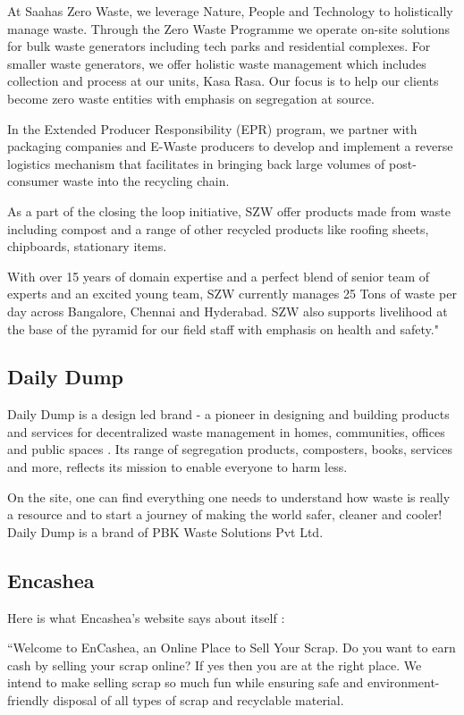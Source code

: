 \documentclass[10pt]{article}
\begin{document}
At Saahas Zero Waste, we leverage Nature, People and Technology to holistically manage waste. Through the Zero Waste Programme we operate on-site solutions for bulk waste generators including tech parks and residential complexes. For smaller waste generators, we offer holistic waste management which includes collection and process at our units, Kasa Rasa. Our focus is to help our clients become zero waste entities with emphasis on segregation at source.

In the Extended Producer Responsibility (EPR) program, we partner with packaging companies and E-Waste producers to develop and implement a reverse logistics mechanism that facilitates in bringing back large volumes of post-consumer waste into the recycling chain.

As a part of the closing the loop initiative, SZW offer products made from waste including compost and a range of other recycled products like roofing sheets, chipboards, stationary items.

With over 15 years of domain expertise and a perfect blend of senior team of experts and an excited young team, SZW currently manages 25 Tons of waste per day across Bangalore, Chennai and Hyderabad. SZW also supports livelihood at the base of the pyramid for our field staff with emphasis on health and safety."

\subsection{Daily Dump}

Daily Dump is a design led brand - a pioneer in designing and building products and services for decentralized waste management in homes, communities, offices and public spaces \citep{DailyDump:about}. Its range of segregation products, composters, books, services and more, reflects its mission to enable everyone to harm less.

On the site, one can find everything one needs to understand how waste is really a resource and to start a journey of making the world safer, cleaner and cooler! 
Daily Dump is a brand of PBK Waste Solutions Pvt Ltd.

\subsection{Encashea}

Here is what Encashea's website says about itself \citep{Encashea:about}:

``Welcome to EnCashea, an Online Place to Sell Your Scrap. Do you want to earn cash by selling your scrap online? If yes then you are at the right place. We intend to make selling scrap so much fun while ensuring safe and environment-friendly disposal of all types of scrap and recyclable material.
\end{document}
